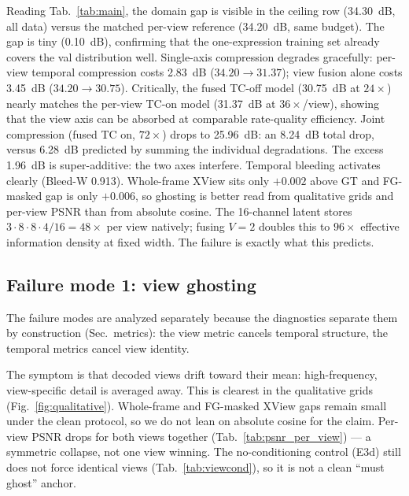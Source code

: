 Reading Tab.~\ref{tab:main}, the domain gap is visible in the ceiling row (34.30~dB, all data) versus the matched per-view reference (34.20~dB, same budget). The gap is tiny (0.10~dB), confirming that the one-expression training set already covers the val distribution well. Single-axis compression degrades gracefully: per-view temporal compression costs 2.83~dB ($34.20{\to}31.37$); view fusion alone costs 3.45~dB ($34.20{\to}30.75$). Critically, the fused TC-off model (30.75~dB at $24\times$) nearly matches the per-view TC-on model (31.37~dB at $36\times$/view), showing that the view axis can be absorbed at comparable rate-quality efficiency. Joint compression (fused TC on, $72\times$) drops to 25.96~dB: an 8.24~dB total drop, versus 6.28~dB predicted by summing the individual degradations. The excess 1.96~dB is super-additive: the two axes interfere. Temporal bleeding activates clearly (Bleed-W 0.913). Whole-frame XView sits only ${+}0.002$ above GT and FG-masked gap is only ${+}0.006$, so ghosting is better read from qualitative grids and per-view PSNR than from absolute cosine. The 16-channel latent stores $3{\cdot}8{\cdot}8{\cdot}4/16 = 48\times$ per view natively; fusing $V{=}2$ doubles this to $96\times$ effective information density at fixed width. The failure is exactly what this predicts.



\subsection{Failure mode 1: view ghosting}

The failure modes are analyzed separately because the diagnostics separate them by construction (Sec.~metrics): the view metric cancels temporal structure, the temporal metrics cancel view identity.

The symptom is that decoded views drift toward their mean: high-frequency, view-specific detail is averaged away. This is clearest in the qualitative grids (Fig.~\ref{fig:qualitative}). Whole-frame and FG-masked XView gaps remain small under the clean protocol, so we do not lean on absolute cosine for the claim. Per-view PSNR drops for both views together (Tab.~\ref{tab:psnr_per_view}) --- a symmetric collapse, not one view winning. The no-conditioning control (E3d) still does not force identical views (Tab.~\ref{tab:viewcond}), so it is not a clean ``must ghost'' anchor.

